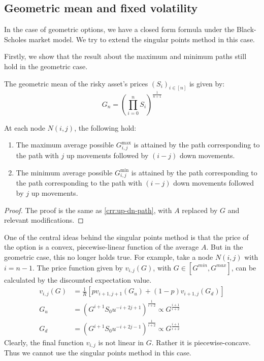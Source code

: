 \subsection{Geometric mean and fixed volatility}
\label{sec:gm-fixed-vol}

In the case of geometric options, we have a closed form formula under the Black-Scholes market model. We try to extend the singular points method in this case.

Firstly, we show that the result about the maximum and minimum paths still hold in the geometric case.

\begin{dfn}
  The geometric mean of the risky asset's prices $ (S_i)_{i \in [n]} $ is given by:
  \begin{equation}
    \label{eq:gm}
    G_{n} = \left( \prod_{i=0}^n S_i \right) ^{\frac{1}{n+1}}
  \end{equation}
\end{dfn}


\begin{lmm}
  At each node $N(i,j)$, the following hold:
  \begin{enumerate}
  \item The maximum average possible $ G_{i,j}^{\max} $ is attained by the path corresponding to the path with $j$ up movements followed by $(i-j)$ down movements.
  \item The minimum average possible $ G_{i,j}^{\min} $ is attained by the path corresponding to the path corresponding to the path with $(i-j)$ down movements followed by $j$ up movements.
  \end{enumerate}
\end{lmm}

\begin{proof}
  The proof is the same as \ref{crr:up-dn-path}, with $A$ replaced by $G$ and relevant modifications.
\end{proof}


One of the central ideas behind the singular points method is that the price of the option is a convex, piecewise-linear function of the average $A$. But in the geometric case, this no longer holds true. For example, take a node $N(i,j)$ with $ i = n-1 $. The price function given by $ v_{i,j}(G) $, with $ G \in [G^{min},G^{max}] $, can be calculated by the discounted expectation value.
\begin{align}
  v_{i,j}(G) &= \frac{1}{R} \left[ p v_{i+1,j+1}(G_u) + (1-p) v_{i+1,j}(G_d) \right] \\
  G_u &= \left( G^{i+1} S_0 u^{-i+2j+1} \right)^{\frac{1}{i+2}} \propto G^{\frac{i+1}{i+2}} \\
  G_d &= \left( G^{i+1} S_0 u^{-i+2j-1} \right)^{\frac{1}{i+2}} \propto G^{\frac{i+1}{i+2}}
\end{align}
Clearly, the final function $ v_{i,j} $ is not linear in $G$. Rather it is piecewise-concave. Thus we cannot use the singular points method in this case.


